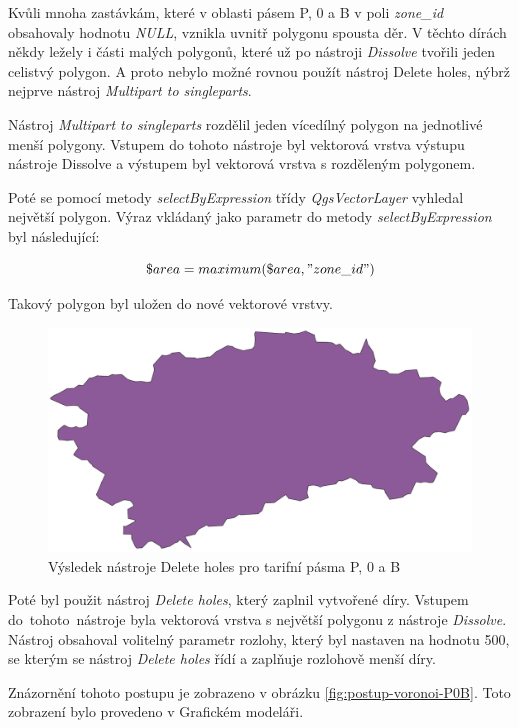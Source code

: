 Kvůli mnoha zastávkám, které v oblasti pásem P, 0 a B v poli \textit{zone\_id} obsahovaly hodnotu \textit{NULL},
vznikla uvnitř polygonu spousta děr. V těchto dírách někdy ležely i části malých polygonů, které 
už po nástroji \textit{Dissolve} tvořili jeden celistvý polygon. A proto nebylo možné rovnou použít nástroj Delete holes,
nýbrž nejprve nástroj \textit{Multipart to singleparts}.

Nástroj \textit{Multipart to singleparts} rozdělil jeden vícedílný polygon na jednotlivé menší polygony. Vstupem do tohoto
nástroje byl vektorová vrstva výstupu nástroje Dissolve a výstupem byl vektorová vrstva s rozděleným polygonem.

Poté se pomocí metody \textit{selectByExpression} třídy \textit{QgsVectorLayer} vyhledal nej\-větší polygon.
Výraz vkládaný jako parametr do metody \textit{selectByExpression} byl následující:

\[\$area = maximum(\$area, "zone\_id")\]

Takový polygon byl uložen do nové vektorové vrstvy. 

\begin{figure}[H] \centering
    \includegraphics[width=400pt]{./pictures/without-holes-P0B.png}
    \caption[Výsledek nástroje Delete holes pro tarifní pásma P, 0 a B]{Výsledek nástroje Delete holes pro tarifní pásma P, 0 a B}
	\label{fig:without-holes-P0B}              
\end{figure} 

Poté byl použit nástroj \textit{Delete holes}, který zaplnil vytvořené díry. Vstupem do~tohoto~nástroje byla vektorová
vrstva s největší polygonu z nástroje \textit{Dissolve}. Nástroj obsahoval volitelný parametr rozlohy, který byl
nastaven na hodnotu 500, se kterým se nástroj \textit{Delete holes} řídí a zaplňuje rozlohově menší díry.  

Znázornění tohoto postupu je zobrazeno v obrázku \ref{fig:postup-voronoi-P0B}. Toto zobrazení bylo provedeno v Grafickém modeláři.

